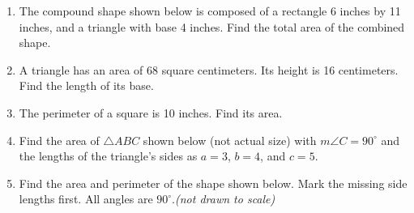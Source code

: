 \begin{enumerate}
\item The compound shape shown below is composed of a rectangle 6 inches by 11 inches, and a triangle with base 4 inches. Find the total area of the combined shape.
    \vspace{0.5cm} 
    \begin{flushleft}
    \end{flushleft}

\item A triangle has an area of 68 square centimeters. Its height is 16 centimeters. Find the length of its base. \vspace{3cm}

\item The perimeter of a square is 10 inches. Find its area. \vspace{4cm}

\item Find the area of $\triangle ABC$ shown below (not actual size) with $m\angle C=90^\circ$ and the lengths of the triangle's sides as $a=3$, $b=4$, and $c=5$. 
  \begin{flushright}
  \end{flushright}
\vspace{1cm}

\item Find the area and perimeter of the shape shown below. Mark the missing side lengths first. All angles are $90^\circ$.\hfill \emph{(not drawn to scale)}
\begin{flushleft}
\end{flushleft} \vspace{1cm}



\end{enumerate}

